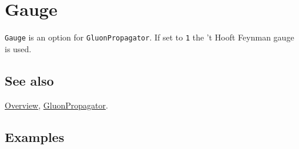 \documentclass[../FeynCalcManual.tex]{subfiles}
\begin{document}
\hypertarget{gauge}{%
\section{Gauge}\label{gauge}}

\texttt{Gauge} is an option for \texttt{GluonPropagator}. If set to
\texttt{1} the 't Hooft Feynman gauge is used.

\subsection{See also}

\hyperlink{toc}{Overview}, \hyperlink{gluonpropagator}{GluonPropagator}.

\subsection{Examples}
\end{document}
